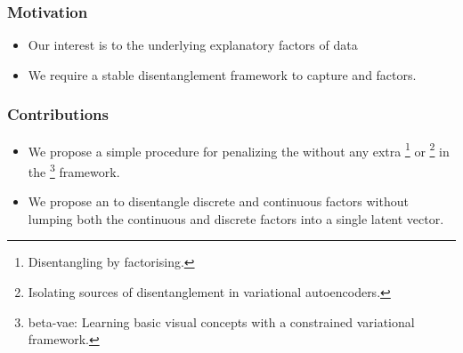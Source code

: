 \documentclass[10pt,mathserif]{beamer}
\begin{document}
\begin{frame}
\begin{figure}
%
\end{figure}
\end{frame}

\begin{frame}
\frametitle{Motivation}
\begin{itemize}\itemsep=20pt
\item Our interest is to {\color{blue}{disentangle}} the underlying explanatory factors of data {\color{blue}{without any supervision.}}\pause
\item We require a stable disentanglement framework to capture {\color{blue}{continuous}} and {\color{blue}{discrete}} factors.
\end{itemize}
\end{frame}

\begin{frame}
\frametitle{Contributions}
\begin{itemize}\itemsep=20pt
        \item We propose a simple procedure for penalizing the {\color{blue}{total correlation}} without any extra {\color{blue}{discriminator network(FactorVAE)}}\footnote{{\color{blue}{Kim, H. and Mnih, A.}} Disentangling by factorising. {\color{gray}{ICML2018}}} or {\color{blue}{importance sampling}} \footnote{{\color{blue}{Chen, T. Q., Li, X., Grosse, R. B., and Duvenaud, D. K.}} Isolating sources of disentanglement in variational autoencoders. {\color{gray}{NIPS2018}}} in the {\color{blue}{$\beta$-VAE}} \footnote{{\color{blue}{Higgins, I., Matthey, L., Pal, A., Burgess, C., Glorot, X., Botvinick, M., Mohamed, S., and Lerchner, A.}} beta-vae: Learning basic visual concepts with a constrained variational framework. {\color{gray}{ICLR2017}}} framework.\pause
\item We propose an {\color{blue}{alternating disentanglement method}} to disentangle discrete and continuous factors without lumping both the continuous and discrete factors into a single latent vector.
\end{itemize}
\end{frame}
\end{document}
